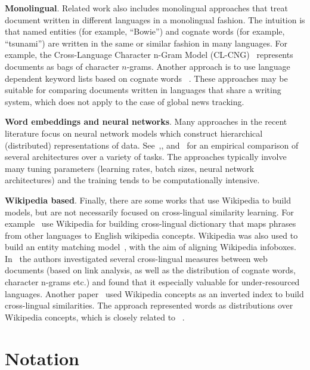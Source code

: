 \textbf{Monolingual}. Related work also includes monolingual approaches that treat document written in different languages in a monolingual fashion. The intuition is that named entities (for example, ``Bowie'') and cognate words (for example, ``tsunami'') are written in the same or similar fashion in many languages. For example, the Cross-Language Character n-Gram Model (CL-CNG)~\cite{plagiarism} represents documents as bags of character $n$-grams. Another approach is to use language dependent keyword lists based on cognate words ~\cite{pouliquen2008story}. These approaches may be suitable for comparing documents written in languages that share a writing system, which does not apply to the case of global news tracking.

\textbf{Word embeddings and neural networks}.
Many approaches in the recent literature focus on neural network models which construct hierarchical (distributed) representations of data. See~\cite{Hermann:2014:ACLphil},\cite{DBLP:conf/acl/VulicM15},\cite{lu2015deep} and~\cite{bicompare:16} for an empirical comparison of several architectures over a variety of tasks. The approaches typically involve many tuning parameters (learning rates, batch sizes, neural network architectures) and the training tends to be computationally intensive.

\textbf{Wikipedia based}. Finally, there are some works that use Wikipedia to build models, but are not necessarily focused on cross-lingual similarity learning. For example~\cite{SPITKOVSKY12.266} use Wikipedia for building cross-lingual dictionary that maps phrases from other languages to English wikipedia concepts. Wikipedia was also used to build an entity matching model~\cite{rinser2013cross}, with the aim of aligning Wikipedia infoboxes. In~ \cite{barron2014comparison} the authors investigated several cross-lingual measures between web documents (based on link analysis, as well as the distribution of cognate words, character n-grams etc.) and found that it especially valuable for under-resourced languages. Another paper~\cite{sogaard2015inverted} used Wikipedia concepts as an inverted index to build cross-lingual similarities. The approach represented words as distributions over Wikipedia concepts, which is closely related to ~\cite{ESA}.


\section{Notation}\label{chap:crosslingual:notation}

